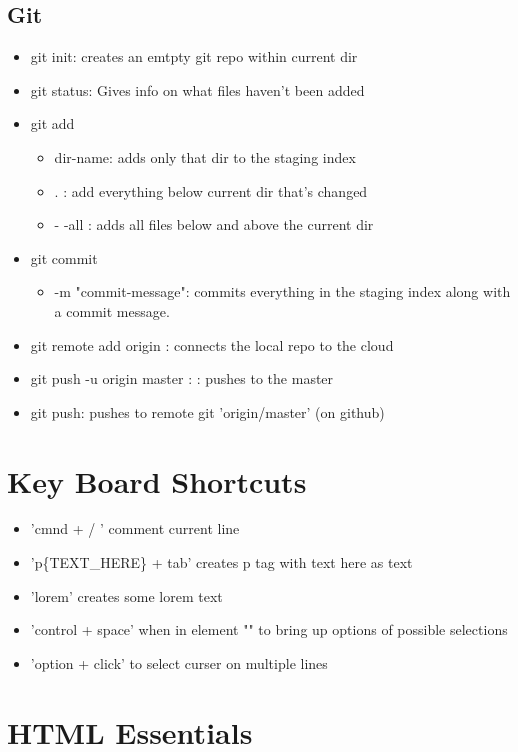\documentclass[]{article}
\begin{document}
\subsection{Git}
\begin{itemize}
	\item git init: creates an emtpty git repo within current dir
	\item git status: Gives info on what files haven't been added
	\item git add 
	\begin{itemize}
		\item dir-name: adds only that dir to the staging index
		\item . : add everything below current dir that's changed
		\item  - -all : adds all files below and above the current dir 
	\end{itemize}
	\item git commit 
	\begin{itemize}
		\item -m "commit-message": commits everything in the staging index along with a commit message.
	\end{itemize}
	\item git remote add origin : connects the local repo to the cloud 
	\item git push -u origin master : : pushes to the master 
	\item git push: pushes to remote git 'origin/master' (on github)
\end{itemize}

\section{Key Board Shortcuts}
	\begin{itemize}
		\item 'cmnd + / ' comment current line 
		\item 'p\{TEXT\_HERE\} + tab' creates p tag with text here as text 
		\item 'lorem' creates some lorem text
		\item 'control + space' when in element "" to bring up options of possible selections
		\item 'option + click' to select curser on multiple lines
	\end{itemize}

\section{HTML Essentials}
\end{document}
